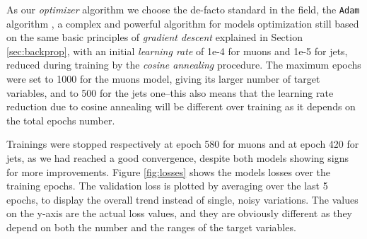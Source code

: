 As our \emph{optimizer} algorithm we choose the de-facto standard in the field, the \texttt{Adam} algorithm \cite{https://doi.org/10.48550/arxiv.1412.6980}, a complex and powerful algorithm for models optimization still based on the same basic principles of \emph{gradient descent} explained in Section \ref{sec:backprop}, with an initial \emph{learning rate} of 1e-4 for muons and 1e-5 for jets, reduced during training by the \emph{cosine annealing} procedure. The maximum epochs were set to 1000 for the muons model, giving its larger number of target variables, and to 500 for the jets one--this also means that the learning rate reduction due to cosine annealing will be different over training as it depends on the total epochs number.

Trainings were stopped respectively at epoch 580 for muons and at epoch 420 for jets, as we had reached a good convergence, despite both models showing signs for more improvements. Figure \ref{fig:losses} shows the models losses over the training epochs. The validation loss is plotted by averaging over the last 5 epochs, to display the overall trend instead of single, noisy variations. The values on the y-axis are the actual loss values, and they are obviously different as they depend on both the number and the ranges of the target variables.


